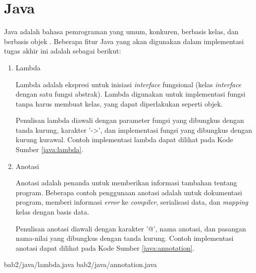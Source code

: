 \section{Java}
\par Java adalah bahasa pemrograman yang umum, konkuren, berbasis kelas, dan berbasis objek \cite{java-online}. Beberapa fitur Java yang akan digunakan dalam implementasi tugas akhir ini adalah sebagai berikut:
\begin{enumerate}[listparindent=2.5em]
	\item Lambda
	\par Lambda adalah ekspresi untuk inisiasi \textit{interface} fungsional (kelas \textit{interface} dengan satu fungsi abstrak). Lambda digunakan untuk implementasi fungsi tanpa harus membuat kelas, yang dapat diperlakukan seperti objek.
	\par Penulisan lambda diawali dengan parameter fungsi yang dibungkus dengan tanda kurung, karakter '->', dan implementasi fungsi yang dibungkus dengan kurung kurawal. Contoh implementasi lambda dapat dilihat pada Kode Sumber \ref{java:lambda}.
	\item Anotasi
	\par Anotasi adalah penanda untuk memberikan informasi tambahan tentang program. Beberapa contoh penggunaan anotasi adalah untuk dokumentasi program, memberi informasi \textit{error} ke \textit{compiler}, serialisasi data, dan \textit{mapping} kelas dengan basis data. 
	\par Penulisan anotasi diawali dengan karakter '@', nama anotasi, dan pasangan nama-nilai yang dibungkus dengan tanda kurung. Contoh implementasi anotasi dapat dilihat pada Kode Sumber \ref{java:annotation}.
\end{enumerate}
 {bab2/java/lambda.java}
 {bab2/java/annotation.java}

